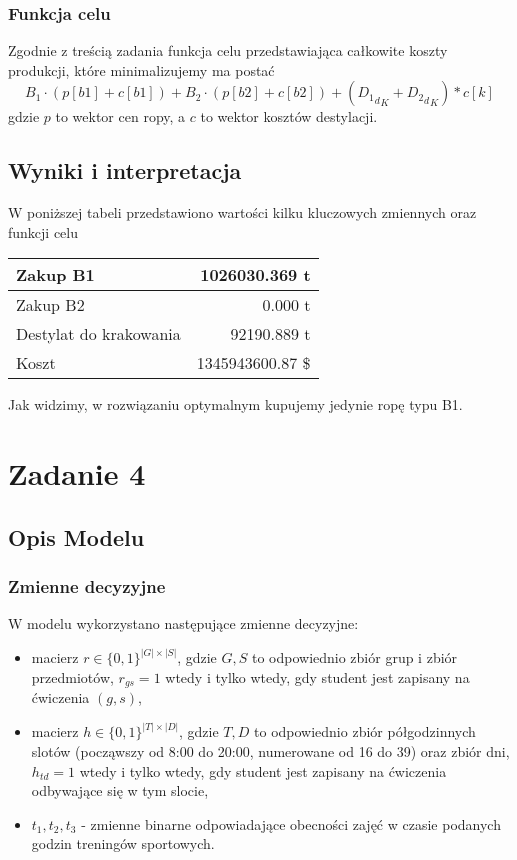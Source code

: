 \documentclass{article}
\begin{document}
\subsubsection{Funkcja celu}
Zgodnie z treścią zadania funkcja celu przedstawiająca całkowite koszty produkcji, które minimalizujemy ma postać
\[B_1 \cdot (p[b1] + c[b1]) + B_2 \cdot (p[b2] + c[b2]) + ({{D_1}_d}_K + {{D_2}_d}_K)*c[k]\]
gdzie $p$ to wektor cen ropy, a $c$ to wektor kosztów destylacji.
\subsection{Wyniki i interpretacja}
W poniższej tabeli przedstawiono wartości kilku kluczowych zmiennych oraz funkcji celu
\begin{table}[H]
\centering
\begin{tabular}{|l|r|}\hline
Zakup B1 & 1026030.369 t\\\hline
Zakup B2 & 0.000 t\\\hline
Destylat do krakowania & 92190.889 t\\\hline
Koszt & 1345943600.87 \$\\\hline
\end{tabular}
\end{table}

Jak widzimy, w rozwiązaniu optymalnym kupujemy jedynie ropę typu B1.

\section{Zadanie 4}
\subsection{Opis Modelu}
\subsubsection{Zmienne decyzyjne}
W modelu wykorzystano następujące zmienne decyzyjne:
\begin{itemize}
	\item macierz $r \in \{0,1\}^{|G| \times |S|}$, gdzie $G,S$ to odpowiednio zbiór grup i zbiór przedmiotów, $r_{gs} = 1$ wtedy i tylko wtedy, gdy student jest zapisany na ćwiczenia $(g,s)$,
	\item macierz $h \in \{0,1\}^{|T| \times |D|}$, gdzie $T,D$ to odpowiednio zbiór półgodzinnych slotów (począwszy od 8:00 do 20:00, numerowane od 16 do 39) oraz zbiór dni, $h_{td} = 1$ wtedy i tylko wtedy, gdy student jest zapisany na ćwiczenia odbywające się w tym slocie,
	\item $t_1,t_2,t_3$ - zmienne binarne odpowiadające obecności zajęć w czasie podanych godzin treningów sportowych.
\end{itemize}
\end{document}
